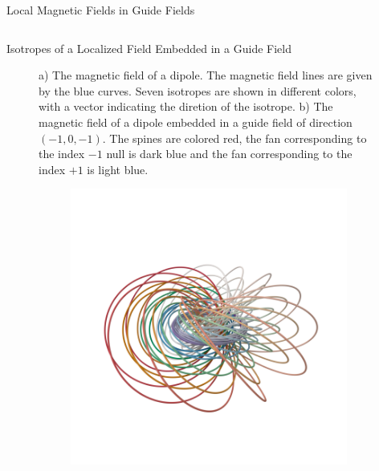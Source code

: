 \documentclass[final]{beamer}
\newlength{\onecolwid}
\newlength{\twocolwid}
\begin{document}
\begin{frame}[t]
\begin{columns}[t]
\begin{column}{\twocolwid}
\begin{block}{\huge{Local Magnetic Fields in Guide Fields}}
\begin{columns}[t,totalwidth=\twocolwid]
\begin{column}{\onecolwid}
\begin{block}{Isotropes of a Localized Field Embedded in a Guide Field}
\begin{figure}
\begin{subfigure}[b]{.45\textwidth}
      \caption{}
    \end{subfigure}
    \caption{
      a) The magnetic field of a dipole.
      The magnetic field lines are given by the blue curves.
      Seven isotropes are shown in different colors, with a vector indicating the diretion of the
      isotrope. b) The magnetic field of a dipole embedded in a guide field of direction $(-1,0,-1)$. 
      The spines are colored red, the fan corresponding to the
      index $-1$ null is dark blue and the fan corresponding to the
      index $+1$ is light blue.
    }
  \end{figure}
  \begin{figure}
    \centering
    \begin{subfigure}[b]{.45\textwidth}
      \includegraphics[width=\textwidth]{fig/onlyhopf.png}
      \caption{}
    \end{subfigure}
    \begin{subfigure}[b]{.45\textwidth}

\end{subfigure}
\end{figure}
\end{block}
\end{column}
\end{columns}
\end{block}
\end{column}
\end{columns}
\end{frame}
\end{document}
